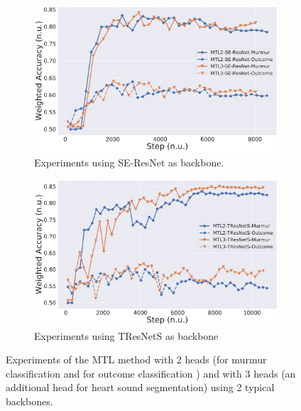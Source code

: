 
\begin{figure}
\centering
\begin{subfigure}[b]{0.49\linewidth}
    \centering
    \includegraphics[width=\textwidth]{images/se-resnet-clf-vs-mtl.pdf}
    \caption[]
    {Experiments using SE-ResNet as backbone.}
    \label{fig:se-resnet-clf-vs-mtl}
\end{subfigure}
\hfill
\begin{subfigure}[b]{0.49\linewidth}
    \centering
    \includegraphics[width=\textwidth]{images/tresnets-clf-vs-mtl.pdf}
    \caption[]
    {Experiments using TResNetS as backbone}
    \label{fig:tresnets-clf-vs-mtl}
\end{subfigure}
\caption[]
{Experiments of the MTL method with 2 heads (for murmur classification and for outcome classification ) and with 3 heads (an additional head for heart sound segmentation) using 2 typical backbones.}
\label{fig:mtl_comparison}
\end{figure}
